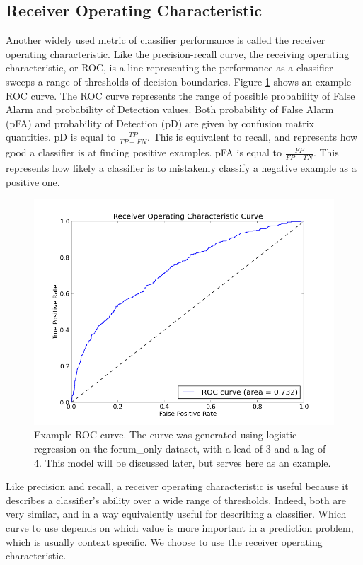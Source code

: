 \subsection{Receiver Operating Characteristic}
Another widely used metric of classifier performance is called the receiver operating characteristic. Like the precision-recall curve, the receiving operating characteristic, or ROC, is a line representing the performance as a classifier sweeps a range of thresholds of decision boundaries. Figure \ref{fig:example_roc} shows an example ROC curve. The ROC curve represents the range of possible probability of False Alarm and probability of Detection values. Both probability of False Alarm (pFA) and probability of Detection (pD) are given by confusion matrix quantities.
pD is equal to $ \frac{TP}{TP + FN}$. This is equivalent to recall, and represents how good a classifier is at finding positive examples.
pFA is equal to $ \frac{FP}{FP + TN}$. This represents how likely a classifier is to mistakenly classify a negative example as a positive one.

\begin{figure}[ht!]
  \caption{Example ROC curve. The curve was generated using logistic regression on the forum\_only dataset, with a lead of 3 and a lag of 4. This model will be discussed later, but serves here as an example.}\label{fig:example_roc}
  \centering
    \includegraphics[width=1.0\textwidth]{figures/example_roc.png}
\end{figure}

Like precision and recall, a receiver operating characteristic is useful because it describes a classifier's ability over a wide range of thresholds. Indeed, both are very similar, and in a way equivalently useful for describing a classifier. Which curve to use depends on which value is more important in a prediction problem, which is usually context specific. We choose to use the receiver operating characteristic.

